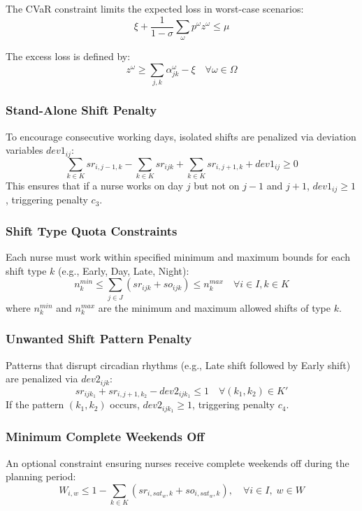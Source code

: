 \documentclass[10pt,a4paper,twocolumn]{article}
\begin{document}
The CVaR constraint limits the expected loss in worst-case scenarios:
\begin{equation}
\xi + \frac{1}{1-\sigma} \sum_{\omega} p^{\omega} z^{\omega} \leq \mu
\end{equation}

The excess loss is defined by:
\begin{equation}
z^{\omega} \geq \sum_{j,k} \alpha_{jk}^{\omega} - \xi 
\quad \forall \omega \in \Omega
\end{equation}

\subsubsection{Stand-Alone Shift Penalty} To encourage consecutive working days, isolated shifts are penalized via deviation variables $dev1_{ij}$:
\begin{equation}
\sum_{k \in K} sr_{i,j-1,k} - \sum_{k \in K} sr_{ijk} + \sum_{k \in K} sr_{i,j+1,k} + dev1_{ij} \geq 0
\end{equation}
This ensures that if a nurse works on day $j$ but not on $j-1$ and $j+1$, $dev1_{ij} \geq 1$, triggering penalty $c_3$.

\subsubsection{Shift Type Quota Constraints} Each nurse must work within specified minimum and maximum bounds for each shift type $k$ (e.g., Early, Day, Late, Night):
\begin{equation}
n_{k}^{min} \leq \sum_{j \in J} (sr_{ijk} + so_{ijk}) \leq n_{k}^{max} \quad \forall i \in I, k \in K
\end{equation}
where $n_{k}^{min}$ and $n_{k}^{max}$ are the minimum and maximum allowed shifts of type $k$.

\subsubsection{Unwanted Shift Pattern Penalty} Patterns that disrupt circadian rhythms (e.g., Late shift followed by Early shift) are penalized via $dev2_{ijk}$:
\begin{equation}
sr_{ijk_1} + sr_{i,j+1,k_2} - dev2_{ijk_1} \leq 1 \quad \forall (k_1, k_2) \in K'
\end{equation}
If the pattern $(k_1, k_2)$ occurs, $dev2_{ijk_1} \geq 1$, triggering penalty $c_4$.

\subsubsection{Minimum Complete Weekends Off} An optional constraint ensuring nurses receive complete weekends off during the planning period:
\begin{equation}
W_{i,w} \leq 1 - \sum_{k \in K} \left( sr_{i,sat_w,k} + so_{i,sat_w,k} \right),
\quad \forall i \in I, \; w \in W
\end{equation}
\end{document}
